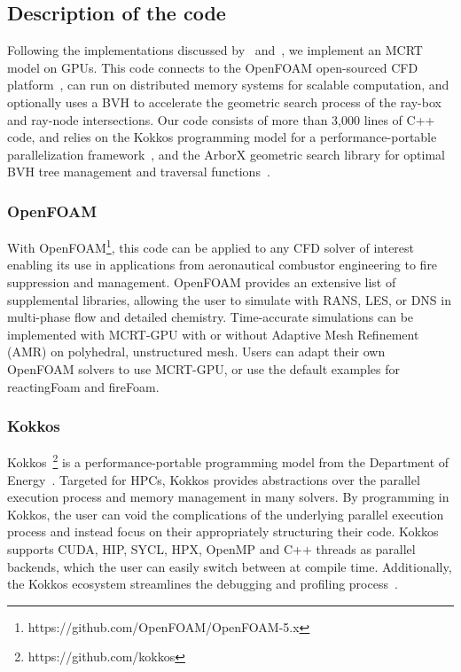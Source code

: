 \subsection{Description of the code}
Following the implementations discussed by~\citet{Silvestri2019ASimulation} and~\citet{Humphrey2015ATracing}, we implement an MCRT model on GPUs. 
This code connects to the OpenFOAM open-sourced CFD platform~\cite{Weller1998ATechniques}, can run on distributed memory systems for scalable computation, and optionally uses a BVH to accelerate the geometric search process of the ray-box and ray-node intersections.
Our code consists of more than 3,000 lines of C++ code, and relies on the Kokkos programming model for a performance-portable parallelization framework~\cite{Trott2021KokkosEra}, and the ArborX geometric search library for optimal BVH tree management and traversal functions~\cite{Lebrun-Grandie2019ArborX:Library}.


\subsubsection{OpenFOAM}
With OpenFOAM\footnote{https://github.com/OpenFOAM/OpenFOAM-5.x}, this code can be applied to any CFD solver of interest enabling its use in applications from aeronautical combustor engineering to fire suppression and management. OpenFOAM provides an extensive list of supplemental libraries, allowing the user to simulate with RANS, LES, or DNS in multi-phase flow and detailed chemistry. 
Time-accurate simulations can be implemented with MCRT-GPU with or without Adaptive Mesh Refinement (AMR) on polyhedral, unstructured mesh.
Users can adapt their own OpenFOAM solvers to use MCRT-GPU, or use the default examples for reactingFoam and fireFoam.

\subsubsection{Kokkos}
Kokkos~\footnote{https://github.com/kokkos} is a performance-portable programming model from the Department of Energy~\cite{Trott_Kokkos3_2022,TrottKokkosOGPaper2014}. 
Targeted for HPCs, Kokkos provides abstractions over the parallel execution process and memory management in many solvers. By programming in Kokkos, the user can void the complications of the underlying parallel execution process and instead focus on their appropriately structuring their code.
Kokkos supports CUDA, HIP, SYCL, HPX, OpenMP and C++ threads as parallel backends, which the user can easily switch between at compile time.
Additionally, the Kokkos ecosystem streamlines the debugging and profiling process~\cite{Trott_KokkosEcosystem2021}.

